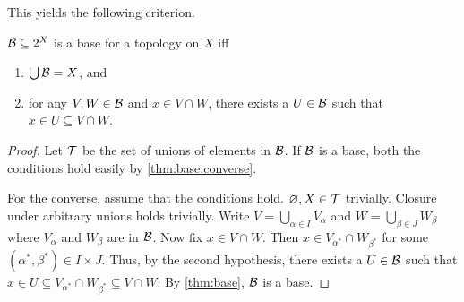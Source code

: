 This yields the following criterion.
\begin{theorem*} \label{thm:base-criterion}
    $\mathcal{B} \subseteq 2^X$ is a base for a topology on $X$ iff
    \begin{enumerate}
        \item $\bigcup \mathcal{B} = X$, and
        \item for any $V, W \in \mathcal{B}$ and $x \in V \cap W$, there exists a
            $U \in \mathcal{B}$ such that $x \in U \subseteq V \cap W$.
    \end{enumerate}
\end{theorem*}
\begin{proof}
    Let $\mathcal{T}$ be the set of unions of elements in $\mathcal{B}$.
    If $\mathcal{B}$ is a base, both the conditions hold easily
    by \cref{thm:base:converse}.

    For the converse, assume that the conditions hold.
    $\varnothing, X \in \mathcal{T}$ trivially.
    Closure under arbitrary unions holds trivially.
    Write $V = \bigcup_{\alpha \in I} V_\alpha$ and
    $W = \bigcup_{\beta \in J} W_\beta$ where $V_\alpha$ and $W_\beta$
    are in $\mathcal{B}$.
    Now fix $x \in V \cap W$.
    Then $x \in V_{\alpha^*} \cap W_{\beta^*}$ for some
    $(\alpha^*, \beta^*) \in I \times J$.
    Thus, by the second hypothesis, there exists a $U \in \mathcal{B}$ such that
    $x \in U \subseteq V_{\alpha^*} \cap W_{\beta^*} \subseteq V \cap W$.
    By \cref{thm:base}, $\mathcal{B}$ is a base.
\end{proof}

